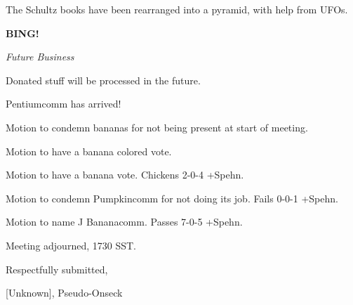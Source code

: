 \documentclass[12pt]{article}
\newcommand{\bing}{{\bf BING!} }
\newcommand{\goto}[1]{\bing \vskip 12pt \centerline{{\em{#1}}}}
\begin{document}
The Schultz books have been rearranged into a pyramid, with help from UFOs.

\goto{Future Business}

Donated stuff will be processed in the future.

Pentiumcomm has arrived!

Motion to condemn bananas for not being present at start of meeting.

Motion to have a banana colored vote.

Motion to have a banana vote. Chickens 2-0-4 +Spehn.

Motion to condemn Pumpkincomm for not doing its job. Fails 0-0-1 +Spehn.

Motion to name J Bananacomm. Passes 7-0-5 +Spehn.

\vspace{12pt}

\noindent
Meeting adjourned, 1730 SST.

\vspace{18pt}

\centerline{Respectfully submitted,}
\centerline{[Unknown], Pseudo-Onseck}
\end{document}
